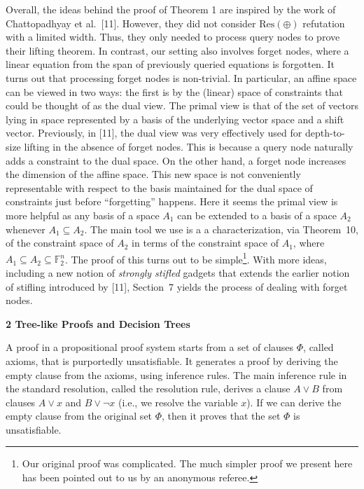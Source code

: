 Overall, the ideas behind the proof of Theorem 1 are inspired by the work of Chattopadhyay et al. [11].
However, they did not consider $\text{Res}(\oplus)$ refutation with a limited width.
Thus, they only needed to process query nodes to prove their lifting theorem.
In contrast, our setting also involves forget nodes, where a linear equation from the span of previously queried equations is forgotten.
It turns out that processing forget nodes is non-trivial. In particular, an affine space can be viewed in two ways: the first is by the (linear) space of constraints that could be thought of as the dual view. The primal view is that of the set of vectors lying in space represented by a basis of the underlying vector space and a shift vector. Previously, in [11], the dual view was very effectively used for depth-to-size lifting in the absence of forget nodes. This is because a query node naturally adds a constraint to the dual space. On the other hand, a forget node increases the dimension of the affine space. This new space is not conveniently representable with respect to the basis maintained for the dual space of constraints just before “forgetting” happens. Here it seems the primal view is more helpful as any basis of a space $A_{1}$ can be extended to a basis of a space $A_{2}$ whenever $A_{1}\subseteq A_{2}$. The main tool we use is a a characterization, via Theorem 10, of the constraint space of $A_{2}$ in terms of the constraint space of $A_{1}$, where $A_{1}\subseteq A_{2}\subseteq\mathbb{F}_{2}^{n}$. The proof of this turns out to be simple\footnote{Our original proof was complicated. The much simpler proof we present here has been pointed out to us by an anonymous referee.}. With more ideas, including a new notion of \emph{strongly stifled} gadgets that extends the earlier notion of stifling introduced by [11], Section 7 yields the process of dealing with forget nodes.\par






\par\medskip\noindent\textbf{
2 Tree-like Proofs and Decision Trees}\par




A proof in a propositional proof system starts from a set of clauses $\Phi$, called axioms, that is purportedly unsatisfiable. It generates a proof by deriving the empty clause from the axioms, using inference rules. The main inference rule in the standard resolution, called the resolution rule, derives a clause $A\vee B$ from clauses $A\vee x$ and $B\vee\lnot x$ (i.e., we resolve the variable $x$).
If we can derive the empty clause from the original set $\Phi$, then it proves that the set $\Phi$ is unsatisfiable.\par




